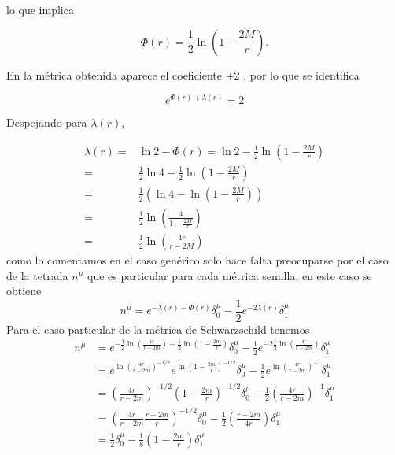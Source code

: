 lo que implica

\begin{equation}
    \Phi(r)=\frac{1}{2} \ln \left(1-\frac{2 M}{r}\right) .
\end{equation}

En la métrica obtenida aparece el coeficiente +2 , por lo que se identifica

\begin{equation}
    e^{\Phi(r)+\lambda(r)}=2
\end{equation}

Despejando para $\lambda(r)$,

\begin{equation}
    \begin{aligned}
        \lambda(r)= & \ln 2-\Phi(r)=\ln 2-\frac{1}{2} \ln \left(1-\frac{2 M}{r}\right)   \\
        =           & \frac{1}{2}\ln 4 -\frac{1}{2} \ln \left(1-\frac{2 M}{r}\right)     \\
        =           & \frac{1}{2} \left(\ln 4 -  \ln \left(1-\frac{2 M}{r}\right)\right) \\
        =           & \frac{1}{2} \ln \left(\frac{4}{1-\frac{2 M}{r}}\right)             \\
        =           & \frac{1}{2} \ln \left(\frac{4 r}{r-2 M}\right)
    \end{aligned}
\end{equation}
como lo comentamos en el caso genérico solo hace falta preocuparse por el caso de la tetrada $n^\mu$ que es particular para cada métrica semilla, en este caso se obtiene
\begin{equation}
    n^\mu=e^{-\lambda(r)-\Phi(r)} \delta_0^\mu-\frac{1}{2} e^{-2 \lambda(r)} \delta_1^\mu
\end{equation}
Para el caso particular de la métrica de Schwarzschild tenemos
\begin{equation}
   \begin{aligned}
    n^\mu&=e^{- \frac{1}{2} \ln \left(\frac{4 r}{r-2 m}\right) -\frac{1}{2} \ln \left(1-\frac{2 m}{r}\right)  }\delta_0^\mu-\frac{1}{2} e^{-2 \frac{1}{2} \ln \left(\frac{4 r}{r-2 m}\right)} \delta_1^\mu \\
    &=e^{\ln \left(\frac{4 r}{r-2 m}\right)^{-1/2}}e^{\ln \left(1-\frac{2 m}{r}\right)^{-1/2}} \delta_0^\mu-\frac{1}{2} e^{\ln \left(\frac{4 r}{r-2 m}\right)^{-1}} \delta_1^\mu \\
    &=\left(\frac{4 r}{r-2 m}\right)^{-1/2}\left(1-\frac{2 m}{r}\right)^{-1/2} \delta_0^\mu-\frac{1}{2} \left(\frac{4 r}{r-2 m}\right)^{-1} \delta_1^\mu \\ 
    &=\left(\frac{4 r}{r-2 m}\frac{r - 2 m}{r}\right)^{-1/2}\delta_0^\mu-\frac{1}{2} \left(\frac{r-2 m}{4r}\right)\delta_1^\mu \\
    &= \frac{1}{2}\delta_0^\mu-\frac{1}{8} \left(1 - \frac{2 m}{r}\right)\delta_1^\mu \\
   \end{aligned}
\end{equation}
